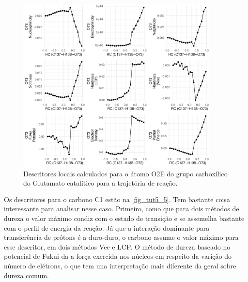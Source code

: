 \documentclass[a4paper,11pt]{refart}
\begin{document}
	 \hspace*{-\leftmarginwidth}
	 \begin{minipage}{\fullwidth}
	 	\begin{figure}[H]
	 		\begin{center}
	 			\includegraphics[width=4in]{la_0}
	 			\caption{Descritores locais calculados para o átomo O2E do grupo carboxílico do Glutamato catalítico para a trajetória de reação.}
	 			\label{fig_tut5_4}
	 		\end{center}
	 	\end{figure}
	 \end{minipage}
	 
	 
	 Os descritores para o carbono C1 estão na \autoref{fig_tut5_5}. Tem bastante coisa interessante para analisar nesse caso. Primeiro, como que para dois métodos de dureza o valor máximo condiz com o estado de transição e se assemelha bastante com o perfil de energia da reação. Já que a interação dominante para transferência de prótons é a duro-duro, o carbono assume o valor máximo para esse descritor, em dois métodos Vee e LCP. O método de dureza baseado no potencial de Fukui da a força exercida nos núcleos em respeito da varição do número de elétrons, o que tem una interpretação mais diferente da geral sobre dureza comum. 
	 
\end{document}
